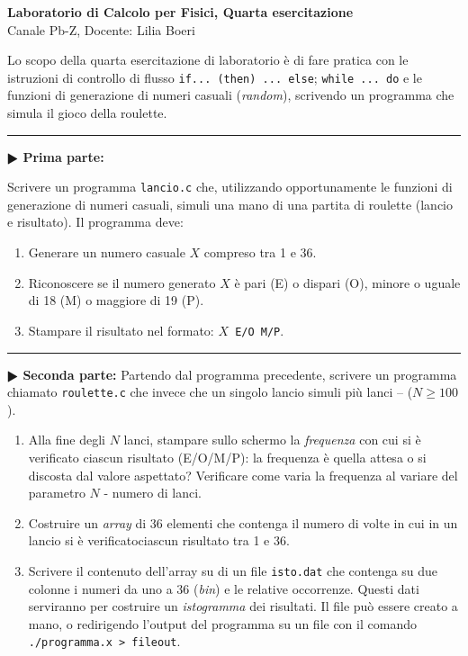 \documentclass[11pt]{article}
\begin{document}
\pagestyle{empty}

\begin{center}
{\Large \bf  Laboratorio di Calcolo per Fisici, Quarta esercitazione\\[2mm]}
{\large Canale Pb-Z, Docente: Lilia Boeri}
\end{center}
\vspace{4mm}

\begin{mdframed}[backgroundcolor=gray!10]
  Lo scopo della quarta esercitazione di laboratorio \`e di fare pratica con
le istruzioni di controllo di flusso \texttt{if... (then) ... else}; \texttt{while ... do} e le funzioni di generazione di numeri casuali ({\em random}), scrivendo un programma che simula il gioco della roulette.
  \end{mdframed}
%
%



\hrule
\vspace{2mm}
\textbf{$\RHD$ Prima parte:}

Scrivere un programma \texttt{lancio.c} che, utilizzando opportunamente le
funzioni di generazione di numeri casuali, simuli una mano di una partita di
roulette (lancio e risultato). Il programma deve: 
\begin{enumerate}
\item Generare un numero casuale $X$ compreso tra 1 e 36. 
\item Riconoscere se il numero generato $X$ \`e pari (E) o dispari (O), minore
o uguale di 18 (M) o maggiore di 19 (P).  
\item Stampare il risultato nel formato: \texttt{$X$ E/O M/P}. 
\end{enumerate}

\hrule
\vspace{2mm}
\textbf{$\RHD$ Seconda parte:}
Partendo dal programma precedente, scrivere un programma chiamato \texttt{roulette.c} che
invece che un singolo lancio simuli pi\`u lanci --  ($N \ge 100$).  
\begin{enumerate}
\item Alla fine degli $N$ lanci, stampare sullo schermo la {\em frequenza}
con cui si \`e verificato ciascun risultato (E/O/M/P): la frequenza
\`e quella attesa o si discosta dal valore aspettato? Verificare come
varia la frequenza al variare del parametro $N$ - numero di lanci. 
\item Costruire un {\em array} di 36 elementi che contenga il numero di
volte in cui  in un lancio  si \`e verificatociascun risultato tra 1 e 36.
\item Scrivere il contenuto dell'array su di un file
  \texttt{isto.dat} che contenga
su due colonne i numeri da uno a 36 ({\em bin}) e le relative occorrenze.
Questi dati serviranno per costruire un {\em istogramma} dei risultati.
Il file pu\`o essere creato a mano, o redirigendo l'output del programma
su un file con il comando \texttt{./programma.x > fileout}.
\end{enumerate}
\end{document}

